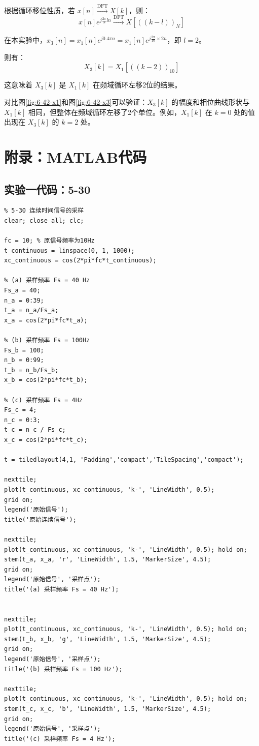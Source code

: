 \documentclass[UTF8,12pt,a4paper]{ctexart}
\begin{document}
根据循环移位性质，若 $x[n] \xrightarrow{\text{DFT}} X[k]$，则：
$$x[n]e^{j\frac{2\pi}{N}ln} \xrightarrow{\text{DFT}} X[((k-l))_N]$$

在本实验中，$x_3[n] = x_1[n]e^{j0.4\pi n} = x_1[n]e^{j\frac{2\pi}{10} \times 2n}$，即 $l = 2$。

则有：
$$X_3[k] = X_1[((k-2))_{10}]$$

这意味着 $X_3[k]$ 是 $X_1[k]$ 在频域循环左移2位的结果。

对比图\ref{fig:6-42-x1}和图\ref{fig:6-42-x3}可以验证：$X_3[k]$ 的幅度和相位曲线形状与 $X_1[k]$ 相同，但整体在频域循环左移了2个单位。例如，$X_1[k]$ 在 $k=0$ 处的值出现在 $X_3[k]$ 的 $k=2$ 处。



\newpage
\section{附录：MATLAB代码}

\subsection{实验一代码：5-30}

\begin{lstlisting}
% 5-30 连续时间信号的采样
clear; close all; clc;

fc = 10; % 原信号频率为10Hz
t_continuous = linspace(0, 1, 1000); 
xc_continuous = cos(2*pi*fc*t_continuous);

% (a) 采样频率 Fs = 40 Hz
Fs_a = 40; 
n_a = 0:39;
t_a = n_a/Fs_a;
x_a = cos(2*pi*fc*t_a);

% (b) 采样频率 Fs = 100Hz
Fs_b = 100;
n_b = 0:99;
t_b = n_b/Fs_b;
x_b = cos(2*pi*fc*t_b);

% (c) 采样频率 Fs = 4Hz
Fs_c = 4;
n_c = 0:3;
t_c = n_c / Fs_c;
x_c = cos(2*pi*fc*t_c);

t = tiledlayout(4,1, 'Padding','compact','TileSpacing','compact');

nexttile; 
plot(t_continuous, xc_continuous, 'k-', 'LineWidth', 0.5); 
grid on;
legend('原始信号');
title('原始连续信号');

nexttile; 
plot(t_continuous, xc_continuous, 'k-', 'LineWidth', 0.5); hold on;
stem(t_a, x_a, 'r', 'LineWidth', 1.5, 'MarkerSize', 4.5);
grid on;
legend('原始信号', '采样点');
title('(a) 采样频率 Fs = 40 Hz');


nexttile; 
plot(t_continuous, xc_continuous, 'k-', 'LineWidth', 0.5); hold on;
stem(t_b, x_b, 'g', 'LineWidth', 1.5, 'MarkerSize', 4.5);
grid on;
legend('原始信号', '采样点');
title('(b) 采样频率 Fs = 100 Hz');

nexttile; 
plot(t_continuous, xc_continuous, 'k-', 'LineWidth', 0.5); hold on;
stem(t_c, x_c, 'b', 'LineWidth', 1.5, 'MarkerSize', 4.5);
grid on;
legend('原始信号', '采样点');
title('(c) 采样频率 Fs = 4 Hz');
\end{lstlisting}
\end{document}
